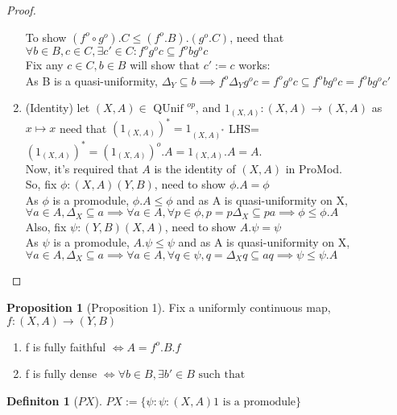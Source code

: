 \documentclass[18pt,a4paper]{article}
\makeatletter
\theoremstyle{definition}
\newtheorem{definition}{Definiton}[section]
\newtheorem{proop}{Proposition}[section]
\newcommand{\carrow}{}%
\DeclareRobustCommand{\carrow}{%
  \mathrel{\vphantom{\rightarrow}\mathpalette\circle@arrow\relax}%
}
\newcommand{\circle@arrow}[2]{%
  \m@th
  \ooalign{%
    \hidewidth$#1\circ\mkern1mu$\hidewidth\cr
    $#1\longrightarrow$\cr}%
}
\makeatother
\begin{document}
\begin{proof}
\begin{enumerate}[label=(\roman*)]
			To show $(f^o \circ g^o).C\leq(f^o .B).(g^o .C)$, need that
			$\forall b \in B, c \in C, \exists c' \in C: f^o g^o c \subseteq f^obg^oc $
			\\Fix any $c\in C, b\in B$ will show that $c':=c$ works:\\
			As B is a quasi-uniformity, $\Delta_Y \subseteq b\implies f^o \Delta_Y
			g^o c=f^o g^o c \subseteq f^o b	g^o c=f^o b g^o c'$
		\item(Identity) let $(X,A)\in \text{ QUnif }^{op} $, and
			$1_{(X,A)}:(X,A)\to(X,A)$ as $x\mapsto x$ need that
			$(1_{(X,A)})^*=1_{(X,A)^*}$
			LHS=$(1_{(X,A)})^*=(1_{(X,A)})^o.A=1_{(X,A)}.A=A$.
			\\Now, it's required that $A$ is the identity of $(X,A)$ in ProMod.\\
			So, fix $\phi:(X,A) \carrow (Y,B)$, need to show $\phi.A=\phi$\\
			As $\phi$ is a promodule, $\phi.A \leq \phi$ and as A is quasi-uniformity on X,\\
			$\forall a\in A, \Delta_X \subseteq a \implies
			\forall a \in A, \forall p \in \phi, p=p\Delta_X\subseteq pa \implies
			\phi \leq \phi.A$\\
			Also, fix $\psi:(Y,B) \carrow (X,A)$, need to show $A.\psi=\psi$\\
			As $\psi$ is a promodule, $A.\psi \leq \psi$ and as A is quasi-uniformity on X,\\
			$\forall a\in A, \Delta_X \subseteq a \implies
			\forall a \in A, \forall q \in \psi, q=\Delta_X q \subseteq aq \implies
			\psi \leq \psi.A$
	\end{enumerate}



\end{proof}
\newpage

\begin{proop}[Proposition 1]
	Fix a uniformly continuous map, $f:(X,A) \rightarrow (Y,B)$
	\begin{enumerate}[label=(\alph*)]
		\item f is fully faithful $\iff A=f^o.B.f$
		\item f is fully dense $\iff \forall b\in B, \exists b' \in B \text{ such that }  $

	\end{enumerate}
\end{proop}

\begin{definition}[$PX$] %
$PX:=\{\psi : \psi:(X,A) \carrow 1 \text{ is a promodule} \}$
\end{definition}
\end{document}
